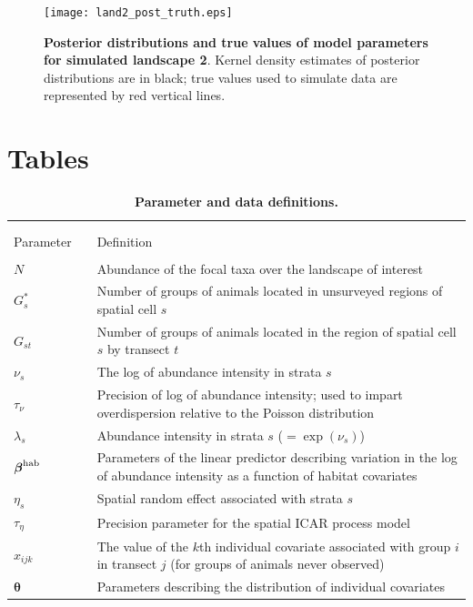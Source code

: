 \documentclass[10pt]{article}
\begin{document}
\begin{figure}
\begin{center}
\texttt{[image: land2\_post\_truth.eps]}
\end{center}
\caption{{\bf Posterior distributions and true values of model parameters for simulated landscape 2}. Kernel density estimates of posterior distributions are in black; true values used to simulate data are represented by red vertical lines.}
\label{fig:land2_post_truth}
\end{figure}
\clearpage


\section*{Tables}

\begin{table}
\caption{\bf Parameter and data definitions.}
\begin{tabular}{p{1.5cm}l p{12.5cm}}
\hline \hline \\
& & \\
Parameter & & Definition \\
\cline{1-1} \cline{3-3}
& & \\
$N$ & & Abundance of the focal taxa over the landscape of interest\\
$G_s^*$ & & Number of groups of animals located in unsurveyed regions of spatial cell $s$\\
$G_{st}$   & & Number of groups of animals located in the region of spatial cell $s$ by transect $t$\\
$\nu_{s}$ & & The log of abundance intensity in strata $s$\\
$\tau_\nu$ & & Precision of log of abundance intensity; used to impart overdispersion relative to the Poisson distribution \\
$\lambda_{s}$ & & Abundance intensity in strata $s$ ($=\exp(\nu_s)$)\\
$\boldsymbol{\beta}^{\rm hab}$ & & Parameters of the linear predictor describing variation in
        the log of abundance intensity as a function of habitat covariates\\
$\eta_s$ & & Spatial random effect associated with strata $s$\\
$\tau_\eta$ & & Precision parameter for the spatial ICAR process model\\
$x_{ijk}$   & &  The value of the $k$th individual covariate associated with
    group $i$ in transect $j$ (for groups of animals never observed)\\
$\boldsymbol{\theta}$ & & Parameters describing the distribution of individual covariates

\end{tabular}
\end{table}
\end{document}
